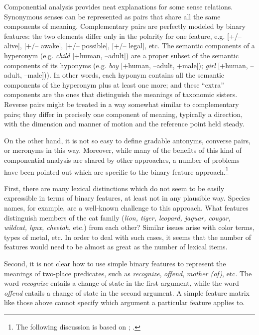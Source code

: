 Componential analysis provides neat explanations for some sense relations. Synonymous senses can be represented as pairs that share all the same components of meaning. Complementary pairs are perfectly modeled by binary features: the two elements differ only in the polarity for one feature, e.g. [+/– alive], [+/– awake], [+/– possible], [+/– legal], etc. The semantic components of a hyperonym (e.g. \textit{child} [+human, –adult]) are a proper subset of the semantic components of its hyponyms (e.g. \textit{boy} [+human, –adult, +male]); \textit{girl} [+human, –adult, –male])). In other words, each hyponym contains all the semantic components of the hyperonym plus at least one more; and these “extra” components are the ones that distinguish the meanings of taxonomic sisters. Reverse pairs might be treated in a way somewhat similar to complementary pairs; they differ in precisely one component of meaning, typically a direction, with the dimension and manner of motion and the reference point held steady.



On the other hand, it is not so easy to define gradable antonyms, converse pairs, or meronyms in this way. Moreover, while many of the benefits of this kind of componential analysis are shared by other approaches, a number of problems have been pointed out which are specific to the binary feature approach.\footnote{The following discussion is based on \citet[129--130]{Engelberg2011}; \citet[317ff.]{Lyons1977}.}



First, there are many lexical distinctions which do not seem to be easily expressible in terms of binary features, at least not in any plausible way. Species names, for example, are a well-known challenge to this approach. What features distinguish members of the cat family (\textit{lion, tiger, leopard, jaguar, cougar, wildcat, lynx, cheetah}, etc.) from each other? Similar issues arise with color terms, types of metal, etc. In order to deal with such cases, it seems that the number of features would need to be almost as great as the number of lexical items.



Second, it is not clear how to use simple binary features to represent the meanings of two-place predicates, such as \textit{recognize}, \textit{offend}, \textit{mother (of)}, etc. The word \textit{recognize} entails a change of state in the first argument, while the word \textit{offend} entails a change of state in the second argument. A simple feature matrix like those above cannot specify which argument a particular feature applies to.



